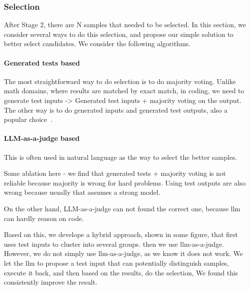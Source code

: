 \subsubsection{Selection}
\label{sec:scale_selection}
After Stage 2, there are N samples that needed to be selected. In this section, we consider several ways to do this selection, and propose our simple solution to better select candidates. We consider the following algorithms.

\paragraph{Generated tests based} The most straightforward way to do selection is to do majority voting. Unlike math domains, where results are matched by exact match, in coding, we need to generate test inputs -> Generated test inputs + majority voting on the output. The other way is to do generated inputs and generated test outputs, also a popular choice~\citep{ehrlich2025codemonkeys}.

\paragraph{LLM-as-a-judge based} This is often used in natural language as the way to select the better samples.


Some ablation here - we find that generated tests + majority voting is not reliable because majority is wrong for hard problems. Using test outputs are also wrong because usually that assumes a strong model.

On the other hand, LLM-as-a-judge can not found the correct one, because llm can hardly reason on code.

Based on this, we develope a hybrid approach, shown in some figure, that first uses test inputs to cluster into several groups. then we use llm-as-a-judge. However, we do not simply use llm-as-a-judge, as we know it does not work. We let the llm to propose a test input that can potentially distinguish samples, execute it back, and then based on the results, do the selection, We found this consistently improve the result.
